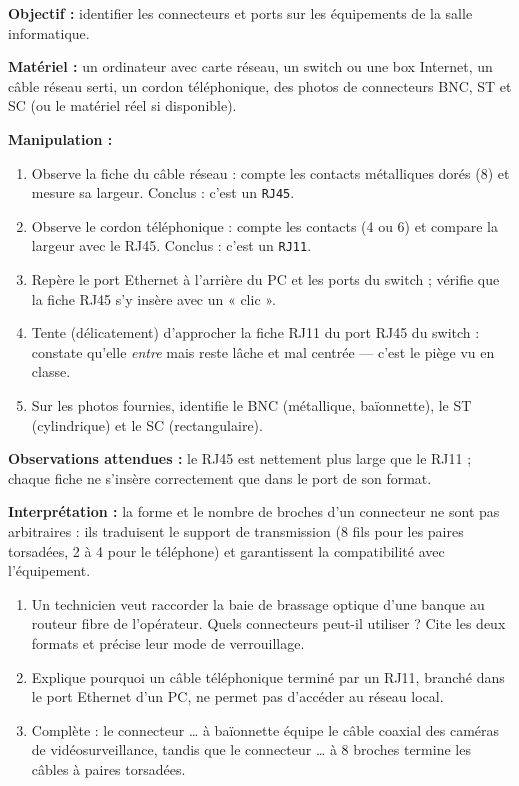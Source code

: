 \documentclass[11pt]{article}
\begin{document}
\begin{experience}
\textbf{Objectif :} identifier les connecteurs et ports sur les équipements de la salle informatique.

\textbf{Matériel :} un ordinateur avec carte réseau, un switch ou une box Internet, un câble réseau serti, un cordon téléphonique, des photos de connecteurs BNC, ST et SC (ou le matériel réel si disponible).

\textbf{Manipulation :}
\begin{enumerate}
\item Observe la fiche du câble réseau : compte les contacts métalliques dorés (8) et mesure sa largeur. Conclus : c'est un \texttt{RJ45}.
\item Observe le cordon téléphonique : compte les contacts (4 ou 6) et compare la largeur avec le RJ45. Conclus : c'est un \texttt{RJ11}.
\item Repère le port Ethernet à l'arrière du PC et les ports du switch ; vérifie que la fiche RJ45 s'y insère avec un « clic ».
\item Tente (délicatement) d'approcher la fiche RJ11 du port RJ45 du switch : constate qu'elle \emph{entre} mais reste lâche et mal centrée — c'est le piège vu en classe.
\item Sur les photos fournies, identifie le BNC (métallique, baïonnette), le ST (cylindrique) et le SC (rectangulaire).
\end{enumerate}

\textbf{Observations attendues :} le RJ45 est nettement plus large que le RJ11 ; chaque fiche ne s'insère correctement que dans le port de son format.

\textbf{Interprétation :} la forme et le nombre de broches d'un connecteur ne sont pas arbitraires : ils traduisent le support de transmission (8 fils pour les paires torsadées, 2 à 4 pour le téléphone) et garantissent la compatibilité avec l'équipement.
\end{experience}

\begin{exercice}
\begin{enumerate}
\item Un technicien veut raccorder la baie de brassage optique d'une banque au routeur fibre de l'opérateur. Quels connecteurs peut-il utiliser ? Cite les deux formats et précise leur mode de verrouillage.
\item Explique pourquoi un câble téléphonique terminé par un RJ11, branché dans le port Ethernet d'un PC, ne permet pas d'accéder au réseau local.
\item Complète : le connecteur \ldots{} à baïonnette équipe le câble coaxial des caméras de vidéosurveillance, tandis que le connecteur \ldots{} à 8 broches termine les câbles à paires torsadées.
\end{enumerate}
\end{exercice}
\end{document}
